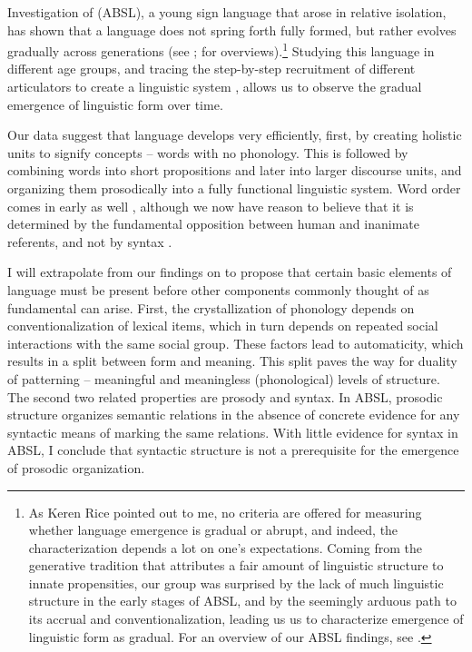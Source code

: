 \documentclass[output=paper]{langsci/langscibook}
\begin{document}
\newpage 
Investigation of  (ABSL), a young sign language that arose in relative isolation, has shown that a language does not spring forth fully formed, but rather evolves gradually across generations (see \citealt{Aronoff2008}; \citealt{Sandler2014handbook} for overviews).\footnote{As Keren Rice pointed out to me, no criteria are offered for measuring whether language emergence is gradual or abrupt, and indeed, the characterization depends a lot on one’s expectations.  Coming from the generative tradition that attributes a fair amount of linguistic structure to innate propensities, our group was surprised by the lack of much linguistic structure in the early stages of ABSL, and by the seemingly arduous path to its accrual and conventionalization, leading us us to characterize emergence of linguistic form as gradual.  For an overview of our ABSL findings, see \citealt{Sandler2014handbook}.}  Studying this language in different age groups, and tracing the step-by-step recruitment of different articulators to create a linguistic system \citep{Sandler2012a}, allows us to observe the gradual emergence of linguistic form over time. 

  Our data suggest that language develops very efficiently, first, by creating holistic units to signify concepts -- words with no phonology.   This is followed by combining words into short propositions and later into larger discourse units, and organizing them prosodically into a fully functional linguistic system.  Word order comes in early as well \citep{Sandler2005}, although we now have reason to believe that it is determined by the fundamental opposition between human and inanimate referents, and not by syntax \citep{MeirSubmitted}. 

    I will extrapolate from our findings on  to propose that certain basic elements of language must be present before other components commonly thought of as fundamental can arise.  First, the crystallization of phonology depends on conventionalization of lexical items, which in turn depends on repeated social interactions with the same social group.  These factors lead to automaticity, which results in a split between form and meaning. This split paves the way for duality of patterning \citep{Hockett1960} -- meaningful and meaningless (phonological) levels of structure.  The second two related properties are prosody and syntax.  In ABSL, prosodic structure organizes semantic relations in the absence of concrete evidence for any syntactic means of marking the same relations.  With little evidence for syntax in ABSL, I conclude that syntactic structure is not a prerequisite for the emergence of prosodic organization. 
\end{document}
